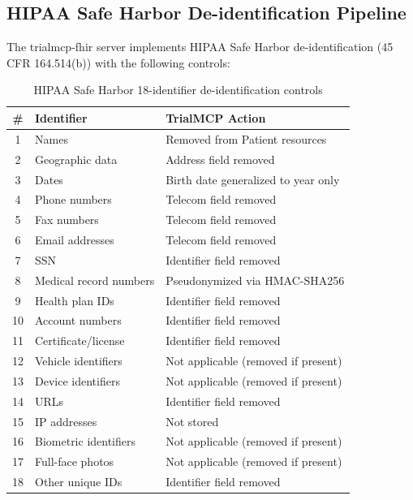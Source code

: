 \documentclass[10pt,letterpaper]{article}
\begin{document}
\subsection{HIPAA Safe Harbor De-identification Pipeline}

The trialmcp-fhir server implements HIPAA Safe Harbor de-identification (45 CFR 164.514(b)) \cite{hipaa1996} with the following controls:

\begin{table}[H]
\centering
\caption{HIPAA Safe Harbor 18-identifier de-identification controls}
\label{tab:hipaa}
\small
\begin{tabularx}{\textwidth}{c l X}
\toprule
\textbf{\#} & \textbf{Identifier} & \textbf{TrialMCP Action} \\
\midrule
1 & Names & Removed from Patient resources \\
2 & Geographic data & Address field removed \\
3 & Dates & Birth date generalized to year only \\
4 & Phone numbers & Telecom field removed \\
5 & Fax numbers & Telecom field removed \\
6 & Email addresses & Telecom field removed \\
7 & SSN & Identifier field removed \\
8 & Medical record numbers & Pseudonymized via HMAC-SHA256 \\
9 & Health plan IDs & Identifier field removed \\
10 & Account numbers & Identifier field removed \\
11 & Certificate/license & Identifier field removed \\
12 & Vehicle identifiers & Not applicable (removed if present) \\
13 & Device identifiers & Not applicable (removed if present) \\
14 & URLs & Identifier field removed \\
15 & IP addresses & Not stored \\
16 & Biometric identifiers & Not applicable (removed if present) \\
17 & Full-face photos & Not applicable (removed if present) \\
18 & Other unique IDs & Identifier field removed \\
\bottomrule
\end{tabularx}
\end{table}
\end{document}
